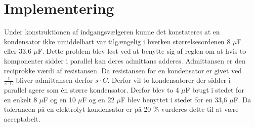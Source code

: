 \section{Implementering}
Under konstruktionen af indgangsvælgeren kunne det konstateres at en kondensator ikke umiddelbart var tilgængelig i hverken størrelsesordenen 8 $\mu$F eller 33,6 $\mu$F. Dette problem blev løst ved at benytte sig af reglen om at hvis to komponenter sidder i parallel kan deres admittans adderes. Admittansen er den reciprokke værdi af resistansen. Da resistansen for en kondensator er givet ved $\frac{1}{s\cdot C}$ bliver admittansen derfor $s\cdot C$. Derfor vil to kondensatorer der sidder i parallel agere som én større kondensator. Derfor blev to 4 $\mu$F brugt i stedet for en enkelt 8 $\mu$F og en 10 $\mu$F og en 22 $\mu$F blev benyttet i stedet for en 33,6 $\mu$F. Da tolerancen på en elektrolyt-kondensator er på 20 \%  vurderes dette til at være acceptabelt.
